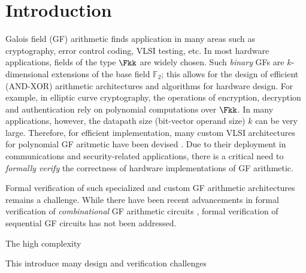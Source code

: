\section{Introduction}
\label{sec:intro}

Galois field (GF) arithmetic finds application in many areas such as 
cryptography, error control coding, VLSI testing, etc. In most
hardware applications, fields of the type $\Fkk$ are widely
chosen. Such {\it binary} GFs are $k$-dimensional extensions
of the base field ${\mathbb{F}}_2$; this allows for the design of
efficient (AND-XOR) arithmetic architectures and algorithms for
hardware design. For example, in elliptic curve cryptography, the
operations of encryption, decryption and authentication rely on
polynomial computations over $\Fkk$. In many applications, however,
the datapath size (bit-vector operand size) $k$ can be very
large. Therefore, for efficient implementation, many custom VLSI
architectures for polynomial GF aritmetic have been devised
\cite{wu:2002} \cite{acar:1998} \cite{agnew1991implementation}
\cite{RHmulti}. Due to their deployment in communications and
security-related applications, there is a critical need to {\it formally
verify} the correctness of hardware implementations of GF arithmetic.  


Formal verification of such specialized and custom GF arithmetic
architectures remains a challenge. While there have been recent
advancements in formal verification of {\it combinational} GF
arithmetic circuits \cite{ibm:blueveri} \cite{lv:tcad2013}
\cite{pruss:dac14}, formal verification of sequential GF circuits has
not been addressed. 

The high complexity

 This introduce many
design and verification challenges

